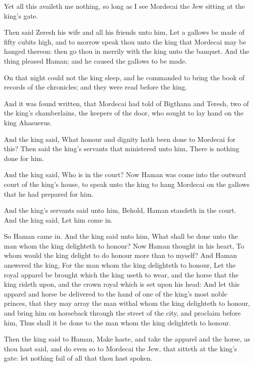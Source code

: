 \Verse Yet all this availeth me nothing, so long as I see Mordecai the Jew sitting at the king's gate.

\Verse Then said Zeresh his wife and all his friends unto him, Let a gallows be made of fifty cubits high, and to morrow speak thou unto the king that Mordecai may be hanged thereon: then go thou in merrily with the king unto the banquet. And the thing pleased Haman; and he caused the gallows to be made.


\Chapter
\Verse On that night could not the king sleep, and he commanded to bring the book of records of the chronicles; and they were read before the king.

\Verse And it was found written, that Mordecai had told of Bigthana and Teresh, two of the king's chamberlains, the keepers of the door, who sought to lay hand on the king Ahasuerus.

\Verse And the king said, What honour and dignity hath been done to Mordecai for this? Then said the king's servants that ministered unto him, There is nothing done for him.

\Verse And the king said, Who is in the court? Now Haman was come into the outward court of the king's house, to speak unto the king to hang Mordecai on the gallows that he had prepared for him.

\Verse And the king's servants said unto him, Behold, Haman standeth in the court. And the king said, Let him come in.

\Verse So Haman came in. And the king said unto him, What shall be done unto the man whom the king delighteth to honour? Now Haman thought in his heart, To whom would the king delight to do honour more than to myself?  \Verse And Haman answered the king, For the man whom the king delighteth to honour, \Verse Let the royal apparel be brought which the king useth to wear, and the horse that the king rideth upon, and the crown royal which is set upon his head: \Verse And let this apparel and horse be delivered to the hand of one of the king's most noble princes, that they may array the man withal whom the king delighteth to honour, and bring him on horseback through the street of the city, and proclaim before him, Thus shall it be done to the man whom the king delighteth to honour.

\Verse Then the king said to Haman, Make haste, and take the apparel and the horse, as thou hast said, and do even so to Mordecai the Jew, that sitteth at the king's gate: let nothing fail of all that thou hast spoken.

